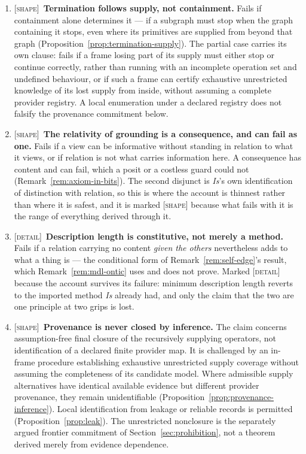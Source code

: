\documentclass[11pt,a4paper]{article}
\theoremstyle{remark}\newtheorem{remark}[definition]{Remark}
\begin{document}
\begin{enumerate}[leftmargin=*]
\item \textsc{[shape]}~\textbf{Termination follows supply, not containment.} Fails if containment alone determines it --- if a subgraph must stop when the graph containing it stops, even where its primitives are supplied from beyond that graph (Proposition~\ref{prop:termination-supply}). The partial case carries its own clause: fails if a frame losing part of its supply must either stop or continue correctly, rather than running with an incomplete operation set and undefined behaviour, or if such a frame can certify exhaustive unrestricted knowledge of its lost supply from inside, without assuming a complete provider registry. A local enumeration under a declared registry does not falsify the provenance commitment below.
\item \textsc{[shape]}~\textbf{The relativity of grounding is a consequence, and can fail as one.} Fails if a view can be informative without standing in relation to what it views, or if relation is not what carries information here. A consequence has content and can fail, which a posit or a costless guard could not (Remark~\ref{rem:axiom-in-bits}). The second disjunct is \emph{Is}'s own identification of distinction with relation, so this is where the account is thinnest rather than where it is safest, and it is marked \textsc{[shape]} because what fails with it is the range of everything derived through it.
\item \textsc{[detail]}~\textbf{Description length is constitutive, not merely a method.} Fails if a relation carrying no content \emph{given the others} nevertheless adds to what a thing is --- the conditional form of Remark~\ref{rem:self-edge}'s result, which Remark~\ref{rem:mdl-ontic} uses and does not prove. Marked \textsc{[detail]} because the account survives its failure: minimum description length reverts to the imported method \emph{Is} already had, and only the claim that the two are one principle at two grips is lost.
\item \textsc{[shape]}~\textbf{Provenance is never closed by inference.}
The claim concerns assumption-free final closure of the recursively supplying
operators, not identification of a declared finite provider map. It is
challenged by an in-frame procedure establishing exhaustive unrestricted
supply coverage without assuming the completeness of its candidate model.
Where admissible supply alternatives have identical available evidence but
different provider provenance, they remain unidentifiable
(Proposition~\ref{prop:provenance-inference}). Local identification from leakage
or reliable records is permitted (Proposition~\ref{prop:leak}). The unrestricted
nonclosure is the separately argued frontier commitment of
Section~\ref{sec:prohibition}, not a theorem derived merely from evidence dependence.
\end{enumerate}
\end{document}
